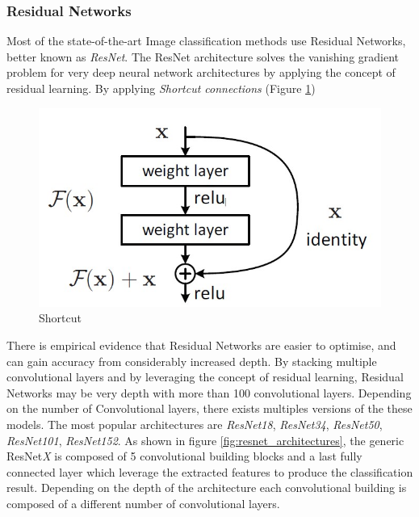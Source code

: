 \subsubsection{Residual Networks} \label{Residual Networks}

Most of the state-of-the-art Image classification methods use Residual Networks, better known as \textit{ResNet}\citep{he2016deep}. The ResNet architecture solves the vanishing gradient problem for very deep neural network architectures by applying the concept of residual learning. By applying \textit{Shortcut connections} (Figure \ref{fig:shortcut}) 

\begin{figure}
\centerline{\includegraphics[scale=0.5]{images/chapter_2/residual_learning.jpg}}
\caption{Shortcut \citep{he2016deep}}
\label{fig:shortcut}
\end{figure}


There is empirical evidence that Residual Networks are easier to optimise, and can gain accuracy from considerably increased depth. By stacking multiple convolutional layers and by leveraging the concept of residual learning, Residual Networks may be very depth with more than 100 convolutional layers. Depending on the number of Convolutional layers, there exists multiples versions of the these models. The most popular architectures are \textit{ResNet18}, \textit{ResNet34}, \textit{ResNet50}, \textit{ResNet101}, \textit{ResNet152}. As shown in figure \ref{fig:resnet_architectures}, the generic ResNet\textit{X} is composed of 5 convolutional building blocks and a last fully connected layer which leverage the extracted features to produce the classification result. Depending on the depth of the architecture each convolutional building is composed of a different number of convolutional layers.

